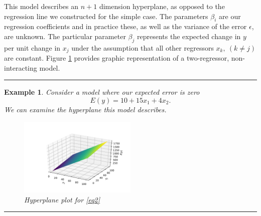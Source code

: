 \documentclass[10pt,a4paper, twocolumn, conference]{IEEEtran}
\theoremstyle{own}
\newtheorem{example}{Example}
\theoremstyle{definition}
\theoremstyle{plain}
\begin{document}
This model describes an $n + 1$ dimension hyperplane, as opposed to the regression line we constructed for the simple case. The parameters $\beta_i$ are our regression coefficients and in practice these, as well as the variance of the error $\epsilon$, are unknown. The particular parameter $\beta_j$ represents the expected change in $y$ per unit change in $x_j$ under the assumption that all other regressors $x_k,~( k \neq j )$ are constant. Figure \ref{fig1} provides graphic representation of a two-regressor, non-interacting model.
\vspace{2mm}
\hrule
\begin{example}
Consider a model where our expected error is zero
\begin{equation} \label{eq2}
E(y) = 10 + 15x_1 + 4x_2.
\end{equation}
We can examine the hyperplane this model describes.
\begin{figure}[H]
\centering
\includegraphics[width = 0.5\textwidth]{f4}
\caption{Hyperplane plot for \cref{eq2}}
\label{fig1}
\end{figure}
\end{example}
\hrule
\vspace{2mm}
\end{document}
